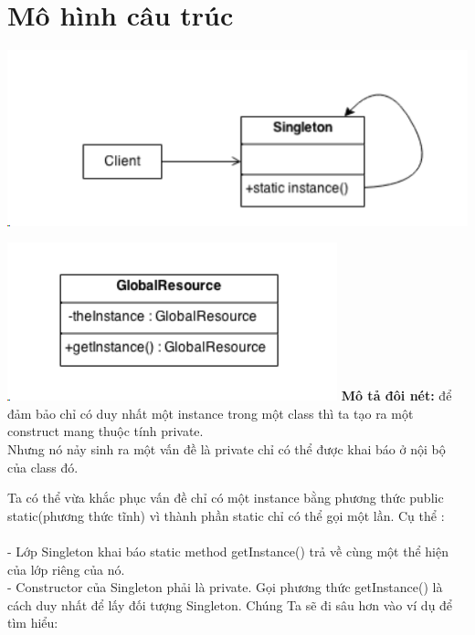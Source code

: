 \section{Mô hình câu trúc}
\includegraphics{GALLEYS/images/chapter1/diagram01}
\begin{multicols}{2}
\vspace{-20pt}
\includegraphics{GALLEYS/images/chapter1/diagram2}
\textbf{Mô tả đôi nét:} để đảm bảo chỉ có duy nhất một instance trong một class thì ta tạo ra một construct mang thuộc tính private.\\
Nhưng nó nảy sinh ra một vấn đề là private chỉ có thể được khai báo ở nội bộ của class đó.
\end{multicols}
Ta có thể vừa khắc phục vấn đề chỉ có một instance bằng phương thức public static(phương thức tĩnh) vì thành phần static chỉ có thể gọi một lần. Cụ thể :\\\\
- Lớp Singleton khai báo static method getInstance() trả về cùng một thể hiện của lớp riêng của nó.\\
- Constructor của Singleton phải là private. Gọi phương thức getInstance() là cách duy nhất để lấy đối tượng Singleton.
Chúng Ta sẽ đi sâu hơn vào ví dụ để tìm hiểu:\\
